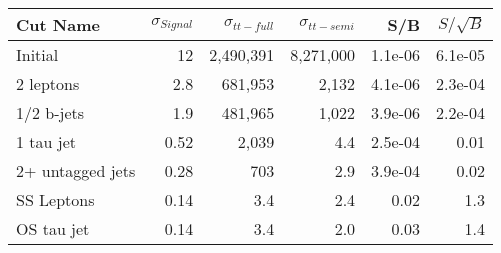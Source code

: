 \begin{tabular}{lrrrrr}
\toprule
         Cut Name &  $\sigma_{Signal}$ &  $\sigma_{tt-full}$ &  $\sigma_{tt-semi}$ &     S/B &  $S/\sqrt{B}$ \\
\midrule
          Initial &                 12 &           2,490,391 &           8,271,000 & 1.1e-06 &       6.1e-05 \\
        2 leptons &                2.8 &             681,953 &               2,132 & 4.1e-06 &       2.3e-04 \\
       1/2 b-jets &                1.9 &             481,965 &               1,022 & 3.9e-06 &       2.2e-04 \\
        1 tau jet &               0.52 &               2,039 &                 4.4 & 2.5e-04 &          0.01 \\
 2+ untagged jets &               0.28 &                 703 &                 2.9 & 3.9e-04 &          0.02 \\
       SS Leptons &               0.14 &                 3.4 &                 2.4 &    0.02 &           1.3 \\
       OS tau jet &               0.14 &                 3.4 &                 2.0 &    0.03 &           1.4 \\
\bottomrule
\end{tabular}
